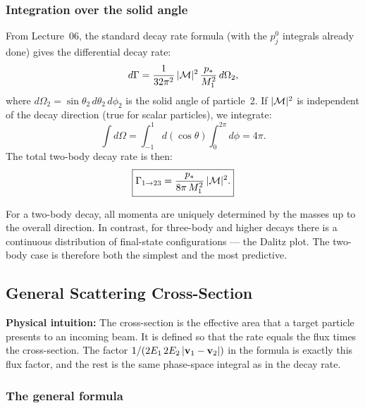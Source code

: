 \documentclass[../main.tex]{subfiles}
\begin{document}
\subsubsection*{Integration over the solid angle}

From Lecture~06, the standard decay rate formula (with the $p_j^0$ integrals already done) gives the differential decay rate:
\begin{equation}
  d\Gamma = \frac{1}{32\pi^2}\,|\mathcal{M}|^2\,
    \frac{p_*}{M_1^2}\,d\Omega_2,
  \label{eq:lec07:dGamma2body}
\end{equation}
where $d\Omega_2 = \sin\theta_2\,d\theta_2\,d\phi_2$ is the solid angle of particle~2.  If $|\mathcal{M}|^2$ is independent of the decay direction (true for scalar particles), we integrate:
\[
  \int d\Omega = \int_{-1}^{1}d(\cos\theta)\int_0^{2\pi}d\phi = 4\pi.
\]
The total two-body decay rate is then:
\begin{equation}
  \boxed{
  \Gamma_{1\to 23} = \frac{p_*}{8\pi\,M_1^2}\,|\mathcal{M}|^2.
  }
  \label{eq:lec07:Gamma2body}
\end{equation}

\begin{remark}
For a two-body decay, all momenta are uniquely determined by the masses up to the overall direction.  In contrast, for three-body and higher decays there is a continuous distribution of final-state configurations — the Dalitz plot.  The two-body case is therefore both the simplest and the most predictive.
\end{remark}

\subsection*{General Scattering Cross-Section}

\noindent\textbf{Physical intuition:} The cross-section is the effective area that a target particle presents to an incoming beam.  It is defined so that the rate equals the flux times the cross-section.  The factor $1/(2E_1\,2E_2\,|\mathbf{v}_1-\mathbf{v}_2|)$ in the formula is exactly this flux factor, and the rest is the same phase-space integral as in the decay rate.

\subsubsection*{The general formula}
\end{document}

